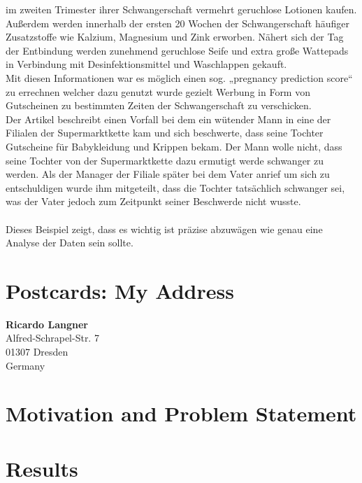 im zweiten Trimester ihrer Schwangerschaft vermehrt geruchlose Lotionen kaufen.
Außerdem werden innerhalb der ersten 20 Wochen der Schwangerschaft häufiger
Zusatzstoffe wie Kalzium, Magnesium und Zink erworben. Nähert sich der Tag der
Entbindung werden zunehmend geruchlose Seife und extra große Wattepads in
Verbindung mit Desinfektionsmittel und Waschlappen gekauft. \\
Mit diesen Informationen war es möglich einen sog. „pregnancy prediction score“
zu errechnen welcher dazu genutzt wurde gezielt Werbung in Form von Gutscheinen
zu bestimmten Zeiten der Schwangerschaft zu verschicken. \\
Der Artikel beschreibt einen Vorfall bei dem ein wütender Mann in eine der
Filialen der Supermarktkette kam und sich beschwerte, dass seine Tochter
Gutscheine für Babykleidung und Krippen bekam. Der Mann wolle nicht, dass seine
Tochter von der Supermarktkette dazu ermutigt werde schwanger zu werden. Als
der Manager der Filiale später bei dem Vater anrief um sich zu entschuldigen
wurde ihm mitgeteilt, dass die Tochter tatsächlich schwanger sei, was der Vater
jedoch zum Zeitpunkt seiner Beschwerde nicht wusste. \\
\\
Dieses Beispiel zeigt, dass es wichtig ist präzise abzuwägen wie genau eine
Analyse der Daten sein sollte. \\

\section{Postcards: My Address}
\label{sec:intro:address}

\textbf{Ricardo Langner} \\
Alfred-Schrapel-Str. 7 \\
01307 Dresden \\
Germany


\section{Motivation and Problem Statement}
\label{sec:intro:motivation}

\Blindtext[3][1] \cite{Jurgens:2000,Jurgens:1995,Miede:2011,Kohm:2011,Apple:keynote:2010,Apple:numbers:2010,Apple:pages:2010}

\section{Results}
\label{sec:intro:results}

